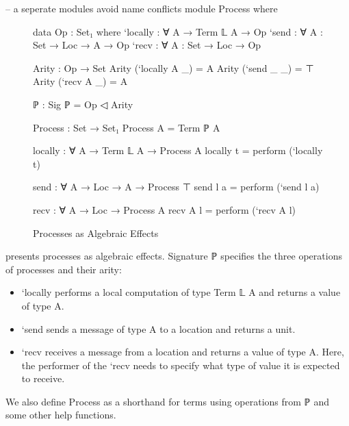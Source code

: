 \begin{code}[hide]
-- a seperate modules avoid name conflicts
module Process where
\end{code}

\begin{figure}[ht]

\begin{minipage}{.45\textwidth}
  \begin{center}\begin{code}
  data Op : Set₁ where
    `locally : ∀ {A} → Term 𝕃 A → Op
    `send    : ∀ {A : Set} → Loc → A → Op
    `recv    : ∀ {A : Set} → Loc → Op

  Arity : Op → Set
  Arity (`locally {A} _) = A
  Arity (`send _ _) = ⊤
  Arity (`recv {A} _) = A

  ℙ : Sig
  ℙ = Op ◁ Arity
  \end{code}\end{center}
\end{minipage}
\hfill\vline\hfill
\begin{minipage}{.45\textwidth}
  \begin{center}\begin{code}
  Process : Set → Set₁
  Process A = Term ℙ A

  locally : ∀ {A} → Term 𝕃 A → Process A
  locally t = perform (`locally t)

  send : ∀ {A} → Loc → A → Process ⊤
  send l a = perform (`send l a)

  recv : ∀ {A} → Loc → Process A
  recv {A} l = perform (`recv {A} l)
  \end{code}\end{center}
\end{minipage}

\caption{Processes as Algebraic Effects}
\label{fig:process}
\end{figure}

 presents processes as algebraic effects.
%
Signature ℙ specifies the three operations of processes and their arity:
%
\begin{itemize}
\item
  `locally performs a local computation of type Term 𝕃 A and returns a value of type A.
\item
  `send sends a message of type A to a location and returns a unit.
\item
  `recv receives a message from a location and returns a value of type A.
  Here, the performer of the `recv needs to specify what type of value it is expected to receive.
\end{itemize}
%
We also define Process as a shorthand for terms using operations from ℙ and some other help functions.
